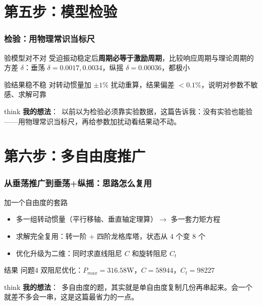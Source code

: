 \documentclass[aspectratio=169]{beamer}
\newcommand{\remark}[2]{%
	\vspace{0.12cm}%
	\begin{beamercolorbox}[rounded=true,sep=6pt]{think}%
		{\color{orchidpurple}\textbf{#1}：}~#2%
	\end{beamercolorbox}%
}
\begin{document}
\section{第五步：模型检验}
\begin{frame}
	\frametitle{检验：用物理常识当标尺}
	\scriptsize
	\begin{block}{验模型对不对}
		受迫振动稳定后\textbf{周期必等于激励周期}，比较响应周期与理论周期的方差 $\delta$：垂荡 $\delta=0.0017,0.0034$，纵摇 $\delta=0.00036$，都极小
	\end{block}
	\begin{block}{验结果稳不稳}
		对转动惯量加 $\pm1\%$ 扰动重算，结果偏差 $<0.1\%$，说明对参数不敏感、求解可靠
	\end{block}
	\remark{我的想法}{以前以为检验必须靠实验数据，这篇告诉我：没有实验也能验——用物理常识当标尺，再给参数加扰动看结果动不动。}
\end{frame}

\section{第六步：多自由度推广}
\begin{frame}
	\frametitle{从垂荡推广到垂荡+纵摇：思路怎么复用}
	\scriptsize
	\begin{block}{加一个自由度的套路}
		\begin{itemize}
			\item 多一组转动惯量（平行移轴、垂直轴定理算）$\rightarrow$ 多一套力矩方程
			\item 求解完全复用：转一阶 + 四阶龙格库塔，状态从 4 个变 8 个
			\item 优化升级为二维：同时求直线阻尼 $C$ 和旋转阻尼 $C_t$
		\end{itemize}
	\end{block}
	\begin{block}{结果}
		问题4 双阻尼优化：$P_{max}=316.58$W，$C=58944$，$C_t=98227$
	\end{block}
	\remark{我的想法}{多自由度的题，其实就是单自由度复制几份再串起来。会一个就差不多会一串，这是这篇最省力的一点。}
\end{frame}

\end{document}
